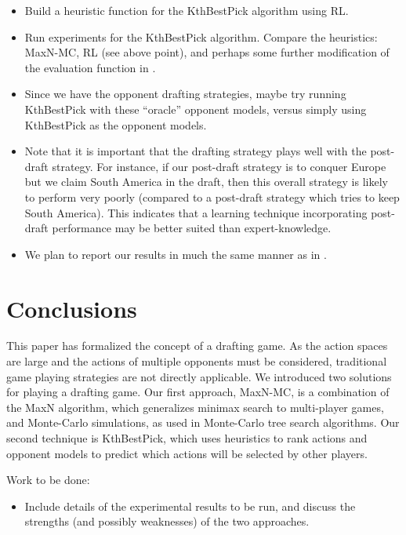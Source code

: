 \documentclass[letterpaper]{article}
\numberwithin{equation}{section}
\numberwithin{theorem}{section}
\numberwithin{lemma}{section}
\numberwithin{df}{section}
\begin{document}
\begin{itemize}
	\item Build a heuristic function for the KthBestPick algorithm using RL.
	\item Run experiments for the KthBestPick algorithm.  Compare the heuristics: MaxN-MC, RL (see above point), and perhaps some further modification of the evaluation function in \cite{RiskBots}.
	\item Since we have the opponent drafting strategies, maybe try running KthBestPick with these ``oracle'' opponent models, versus simply using KthBestPick as the opponent models.
	\item Note that it is important that the drafting strategy plays well with the post-draft strategy.  For instance, if our post-draft strategy is to conquer Europe but we claim South America in the draft, then this overall strategy is likely to perform very poorly (compared to a post-draft strategy which tries to keep South America).  This indicates that a learning technique incorporating post-draft performance may be better suited than expert-knowledge.
	\item We plan to report our results in much the same manner as in \cite{ZuckFelnerKraus2009}.
\end{itemize} 


\section{Conclusions}


This paper has formalized the concept of a drafting game.  As the action spaces are large and the actions of multiple opponents must be considered, traditional game playing strategies are not directly applicable.  We introduced two solutions for playing a drafting game.  Our first approach, MaxN-MC, is a combination of the MaxN algorithm, which generalizes minimax search to multi-player games, and Monte-Carlo simulations, as used in Monte-Carlo tree search algorithms.  Our second technique is KthBestPick, which uses heuristics to rank actions and opponent models to predict which actions will be selected by other players.  

Work to be done:
\begin{itemize}
	\item Include details of the experimental results to be run, and discuss the strengths (and possibly weaknesses) of the two approaches.
\end{itemize}
\end{document}
